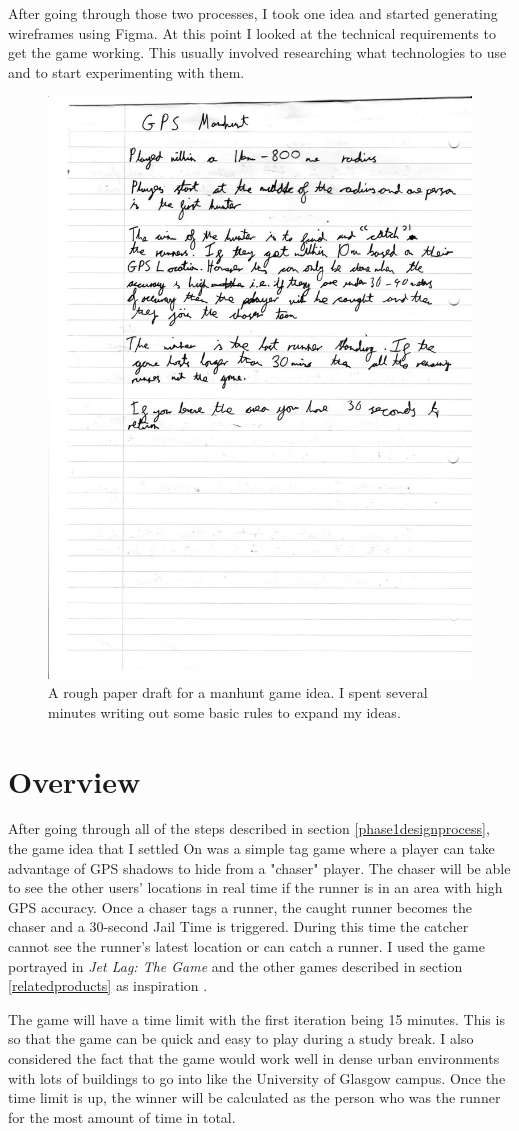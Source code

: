 \documentclass{l4proj}
\begin{document}
After going through those two processes, I took one idea and started generating wireframes using Figma. At this point I
looked at the technical requirements to get the game working. This usually involved researching what technologies to
use and to start experimenting with them.

\begin{figure}
    \centering
    \includegraphics[width=0.5\linewidth]{images/idea2.pdf} 
    \caption{A rough paper draft for a manhunt game idea. I spent several minutes writing out some basic rules to expand my ideas.}
    \label{fig:gameidea}
\end{figure}

\section{Overview}
\label{game-overview}
After going through all of the steps described in section \ref{phase1designprocess}, the game idea that I settled On
was a simple tag game where a player can take advantage of GPS shadows to hide from
a "chaser" player. The chaser will be able to see the other users' locations in real time if the runner is in an area with
high GPS accuracy. Once a chaser tags a runner, the caught runner becomes the chaser and a 30-second Jail Time is
triggered. During this time the catcher cannot see the runner's latest location or can catch a runner. I used
the game portrayed in \emph{Jet Lag: The Game} and the other games described in section \ref{relatedproducts} as inspiration \citep{Chase2022}.

The game will have a time limit with the first iteration being 15 minutes. This is so that the game can be quick and
easy to play during a study break. I also considered the fact that the game would work well in dense urban environments
with lots of buildings to go into like the University of Glasgow campus. Once the time limit is up, the winner will
be calculated as the person who was the runner for the most amount of time in total.
\end{document}
